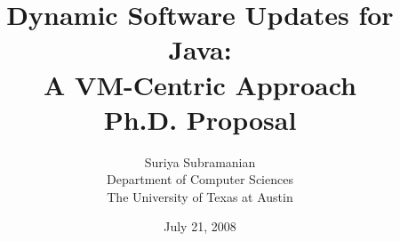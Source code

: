 \documentclass[\DraftOrFinal,11pt,letter]{article}
\begin{document}
\title{
       Dynamic Software Updates for Java:\\ A VM-Centric Approach\\
       \vspace{+0.5em}
       Ph.D. Proposal}

\author{Suriya Subramanian \\
        Department of Computer Sciences \\
        The University of Texas at Austin}

\date{July 21, 2008}

\maketitle










\begin{small}


\end{small}


\end{document}
